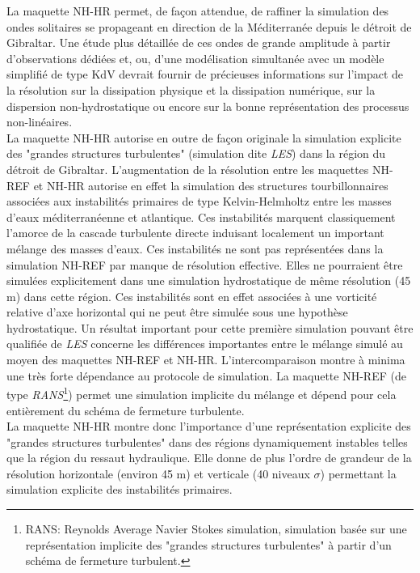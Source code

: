 La maquette NH-HR permet, de façon attendue, de raffiner la simulation des ondes solitaires se propageant en direction de la Méditerranée depuis le détroit de Gibraltar. Une étude plus détaillée de ces ondes de grande amplitude à partir d'observations dédiées et, ou, d'une modélisation simultanée avec un modèle simplifié de type KdV devrait fournir de précieuses informations sur l'impact de la résolution sur la dissipation physique et la dissipation numérique, sur la dispersion non-hydrostatique ou encore sur la bonne représentation des processus non-linéaires.\\
La maquette  NH-HR autorise en outre de façon originale la simulation explicite des "grandes structures turbulentes" (simulation dite \textit{LES}) dans la région du détroit de Gibraltar. L'augmentation de la résolution entre les maquettes NH-REF et NH-HR autorise en effet la simulation des structures tourbillonnaires associées aux instabilités primaires de type Kelvin-Helmholtz entre les masses d'eaux méditerranéenne et atlantique. Ces instabilités marquent classiquement l'amorce de la cascade turbulente directe induisant localement un important mélange des masses d'eaux. Ces instabilités ne sont pas représentées dans la simulation NH-REF par manque de résolution effective. Elles ne pourraient être simulées explicitement dans une simulation hydrostatique de même résolution (45 m) dans cette région. Ces instabilités sont en effet associées à une vorticité relative d'axe horizontal qui ne peut être simulée sous une hypothèse hydrostatique. Un résultat important pour cette première simulation pouvant être qualifiée de \textit{LES} concerne les différences importantes entre le mélange simulé au moyen des maquettes NH-REF et NH-HR. L'intercomparaison montre à minima une très forte dépendance au protocole de simulation. La maquette NH-REF (de type \textit{RANS}\footnote{RANS: Reynolds Average Navier Stokes simulation, simulation basée sur une représentation implicite des "grandes structures turbulentes" à partir d'un schéma de fermeture turbulent.}) permet une simulation implicite du mélange et dépend pour cela entièrement du schéma de fermeture turbulente.\\
La maquette NH-HR montre donc l'importance d'une représentation explicite des "grandes structures turbulentes" dans des régions dynamiquement instables telles que la région du ressaut hydraulique. Elle donne de plus l'ordre de grandeur de la résolution horizontale (environ 45 m) et verticale (40 niveaux $\sigma$) permettant la simulation explicite des instabilités primaires.\\
